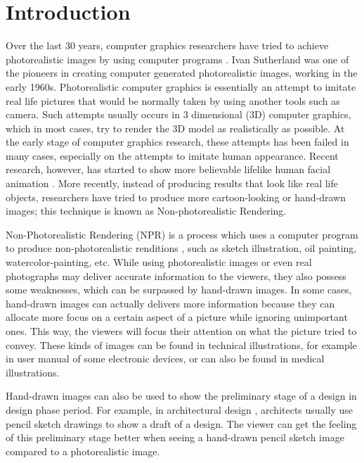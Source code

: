 \chapter{Introduction}

Over the last 30 years, computer graphics researchers have tried to achieve photorealistic images by using computer programs \cite{strothotte02}. Ivan Sutherland was one of the pioneers in creating computer generated photorealistic images, working in the early 1960s. Photorealistic computer graphics is essentially an attempt to imitate real life pictures that would be normally taken by using another tools such as camera. Such attempts usually occurs in 3 dimensional (3D) computer graphics, which in most cases, try to render the 3D model as realistically as possible. At the early stage of computer graphics research, these attempts has been failed in many cases, especially on the attempts to imitate human appearance. Recent research, however, has started to show more believable lifelike human facial animation \cite{emily08}. More recently, instead of producing results that look like real life objects, researchers have tried to produce more cartoon-looking or hand-drawn images; this technique is known as Non-photorealistic Rendering.

Non-Photorealistic Rendering (NPR) is a process which uses a computer program to produce non-photorealistic renditions \cite{strothotte02}, such as sketch illustration, oil painting, watercolor-painting, etc. While using photorealistic images or even real photographs may deliver accurate information to the viewers, they also possess some weaknesses, which can be surpassed by hand-drawn images. In some cases, hand-drawn images can actually delivers more information because they can allocate more focus on a certain aspect of a picture while ignoring unimportant ones. This way, the viewers will focus their attention on what the picture tried to convey. These kinds of images can be found in technical illustrations, for example in user manual of some electronic devices, or can also be found in medical illustrations.

Hand-drawn images can also be used to show the preliminary stage of a design in design phase period. For example, in architectural design \cite{schumann96},  architects usually use pencil sketch drawings to show a draft of a design. The viewer can get the feeling of this preliminary stage better when seeing a hand-drawn pencil sketch image compared to a photorealistic image.

